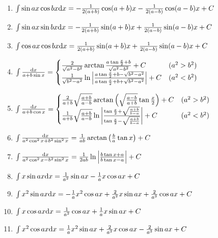 \begin{enumerate}
\item $ \int \sin ax \cos bx \mathrm{d} x = -\frac{1}{2(a+b)}\cos(a+b)x - \frac{1}{2(a-b)}\cos(a-b)x + C $

\item $ \int \sin ax \sin bx \mathrm{d} x = -\frac{1}{2(a+b)}\sin(a+b)x + \frac{1}{2(a-b)}\sin(a-b)x + C $

\item $ \int \cos ax \cos bx \mathrm{d} x =  \frac{1}{2(a+b)}\sin(a+b)x + \frac{1}{2(a-b)}\sin(a-b)x + C $

\item $ \int \frac{\mathrm{d} x}{a + b \sin x} = \begin{cases}
\frac{2}{\sqrt{a^2-b^2}}\arctan\frac{a\tan\frac{x}{2}+b}{\sqrt{a^2-b^2}} + C & (a^2 > b^2) \\
\frac{1}{\sqrt{b^2-a^2}}\ln \left| \frac{a\tan\frac{x}{2}+b-\sqrt{b^2-a^2}}{a\tan\frac{x}{2}+b+\sqrt{b^2-a^2}} \right| + C & (a^2 < b^2)
\end{cases} $

\item $ \int \frac{\mathrm{d} x}{a + b \cos x} = \begin{cases}
\frac{2}{a+b}\sqrt\frac{a+b}{a-b} \arctan\left(\sqrt\frac{a-b}{a+b}\tan\frac{x}{2}\right) + C & (a^2 > b^2) \\
\frac{1}{a+b}\sqrt\frac{a+b}{a-b} \ln \left| \frac{\tan\frac{x}{2}+\sqrt\frac{a+b}{b-a}}{\tan\frac{x}{2}-\sqrt\frac{a+b}{b-a}} \right| + C
& (a^2 < b^2)
\end{cases} $

\item $ \int \frac{\mathrm{d} x}{a^2\cos^2x+b^2\sin^2x} = \frac{1}{ab} \arctan\left( \frac{b}{a}\tan x \right) + C $

\item $ \int \frac{\mathrm{d} x}{a^2\cos^2x-b^2\sin^2x} = \frac{1}{2ab}\ln\left|\frac{b\tan x+a}{b\tan x-a}\right| + C $

\item $ \int x \sin ax \mathrm{d} x = \frac{1}{a^2} \sin ax - \frac{1}{a} x \cos ax + C $

\item $ \int x^2 \sin ax \mathrm{d} x = -\frac{1}{a} x^2 \cos ax + \frac{2}{a^2} x \sin ax + \frac{2}{a^3} \cos ax + C$

\item $ \int x \cos ax \mathrm{d} x = \frac{1}{a^2} \cos ax + \frac{1}{a} x \sin ax + C $

\item $ \int x^2 \cos ax \mathrm{d} x = \frac{1}{a} x^2 \sin ax + \frac{2}{a^2} x \cos ax - \frac{2}{a^3} \sin ax + C $

\end{enumerate}

